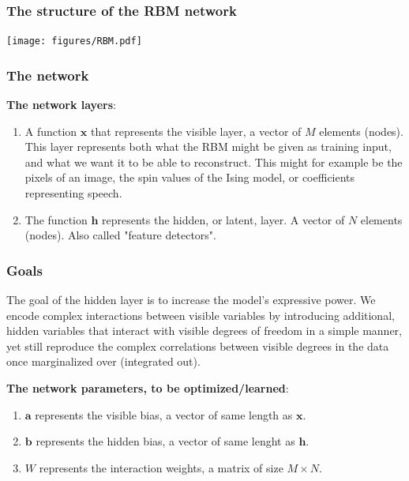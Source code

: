 \documentclass{beamer}
\begin{document}
\begin{frame}
\frametitle{The structure of the RBM network}

\vspace{6mm}

\centerline{\texttt{[image: figures/RBM.pdf]}}

\vspace{6mm}
\end{frame}

\begin{frame}
\frametitle{The network}

\textbf{The network layers}:
\begin{enumerate}
\item A function $\bm{x}$ that represents the visible layer, a vector of $M$ elements (nodes). This layer represents both what the RBM might be given as training input, and what we want it to be able to reconstruct. This might for example be the pixels of an image, the spin values of the Ising model, or coefficients representing speech.

\item The function $\bm{h}$ represents the hidden, or latent, layer. A vector of $N$ elements (nodes). Also called "feature detectors".
\end{enumerate}

\noindent
\end{frame}

\begin{frame}
\frametitle{Goals}

The goal of the hidden layer is to increase the model's expressive
power. We encode complex interactions between visible variables by
introducing additional, hidden variables that interact with visible
degrees of freedom in a simple manner, yet still reproduce the complex
correlations between visible degrees in the data once marginalized
over (integrated out).

\textbf{The network parameters, to be optimized/learned}:
\begin{enumerate}
 \item $\bm{a}$ represents the visible bias, a vector of same length as $\bm{x}$.

 \item $\bm{b}$ represents the hidden bias, a vector of same lenght as $\bm{h}$.

 \item $W$ represents the interaction weights, a matrix of size $M\times N$.
\end{enumerate}

\noindent
\end{frame}
\end{document}
